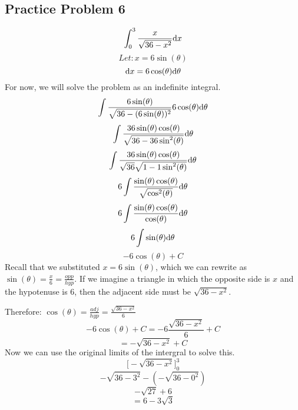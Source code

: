 \documentclass{math}
\begin{document}
\subsection*{Practice Problem 6}
\[ \int_{0}^{3}{\frac{x}{\sqrt{36-x^{2}}}\mathrm{d}{x}} \]
\[ Let: x = 6\sin(\theta) \]
\[ \mathrm{d}{x} = 6\cos(\theta)\mathrm{d}{\theta} \]
For now, we will solve the problem as an indefinite integral.
\[ \int{\frac{6\sin(\theta)}
   {\sqrt{36-(6\sin(\theta))^{2}}}6\cos(\theta)\mathrm{d}{\theta}} \]
\[ \int{\frac{36\sin(\theta)\cos(\theta)}
   {\sqrt{36-36\sin^{2}(\theta)}}\mathrm{d}{\theta}} \]
\[ \int{\frac{36\sin(\theta)\cos(\theta)}
   {\sqrt{36}\sqrt{1-1\sin^{2}(\theta)}}\mathrm{d}{\theta}} \]
\[ 6\int{\frac{\sin(\theta)\cos(\theta)}
   {\sqrt{\cos^{2}(\theta)}}\mathrm{d}{\theta}} \]
\[ 6\int{\frac{\sin(\theta)\cos(\theta)}
   {\cos(\theta)}\mathrm{d}{\theta}} \]
\[ 6\int{\sin(\theta)\mathrm{d}{\theta}} \]
\[ -6\cos(\theta)+C \]
Recall that we substituted \( x = 6\sin(\theta) \), which we can rewrite as
\( \sin(\theta) = \frac{x}{6} = \frac{opp}{hyp} \). If we imagine a triangle in
which the opposite side is \( x \) and the hypotenuse is 6, then the adjacent
side must be \( \sqrt{36-x^{2}} \).
\begin{center}
\end{center}
Therefore: \( \cos(\theta) = \frac{adj}{hyp} = \frac{\sqrt{36-x^{2}}}{6} \)
\[ -6\cos(\theta)+C = -6\frac{\sqrt{36-x^{2}}}{6}+C \]
\[ = -\sqrt{36-x^{2}}+C \]
Now we can use the original limits of the intergral to solve this.
\[ \bigg[-\sqrt{36-x^{2}}\bigg]_{0}^{3} \]
\[ -\sqrt{36-3^{2}}-(-\sqrt{36-0^{2}}) \]
\[ -\sqrt{27}+6 \]
\[ = 6-3\sqrt{3} \]
\end{document}
